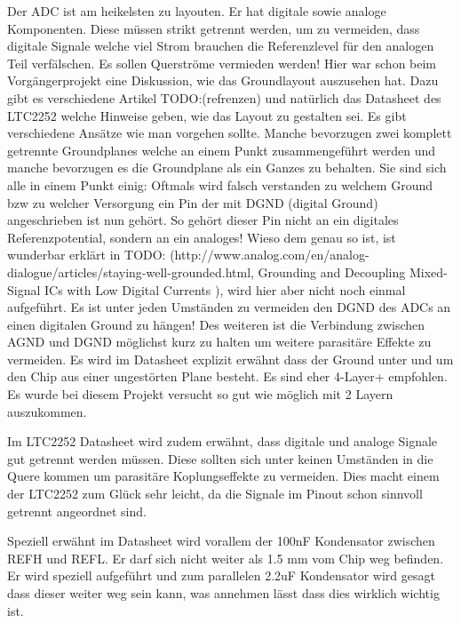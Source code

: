 Der ADC ist am heikelsten zu layouten. Er hat digitale sowie analoge Komponenten. Diese müssen strikt getrennt werden, um zu vermeiden, dass digitale Signale welche viel Strom brauchen die Referenzlevel für den analogen Teil verfälschen. Es sollen Querströme vermieden werden!
Hier war schon beim Vorgängerprojekt eine Diskussion, wie das Groundlayout auszusehen hat. Dazu gibt es verschiedene Artikel TODO:(refrenzen) und natürlich das Datasheet des LTC2252 welche Hinweise geben, wie das Layout zu gestalten sei. Es gibt verschiedene Ansätze wie man vorgehen sollte. Manche bevorzugen zwei komplett getrennte Groundplanes welche an einem Punkt zusammengeführt werden und manche bevorzugen es die Groundplane als ein Ganzes zu behalten. Sie sind sich alle in einem Punkt einig: Oftmals wird falsch verstanden zu welchem Ground bzw zu welcher Versorgung ein Pin der mit DGND (digital Ground) angeschrieben ist nun gehört. So gehört dieser Pin nicht an ein digitales Referenzpotential, sondern an ein analoges! Wieso dem genau so ist, ist wunderbar erklärt in TODO: (http://www.analog.com/en/analog-dialogue/articles/staying-well-grounded.html, Grounding and Decoupling Mixed-Signal ICs with Low Digital Currents ), wird hier aber nicht noch einmal aufgeführt.
Es ist unter jeden Umständen zu vermeiden den DGND des ADCs an einen digitalen Ground zu hängen! Des weiteren ist die Verbindung zwischen AGND und DGND möglichst kurz zu halten um weitere parasitäre Effekte zu vermeiden.
Es wird im Datasheet explizit erwähnt dass der Ground unter und um den Chip aus einer ungestörten Plane besteht. Es sind eher 4-Layer+ empfohlen. Es wurde bei diesem Projekt versucht so gut wie möglich mit 2 Layern auszukommen.

Im LTC2252 Datasheet wird zudem erwähnt, dass digitale und analoge Signale gut getrennt werden müssen. Diese sollten sich unter keinen Umständen in die Quere kommen um parasitäre Koplungseffekte zu vermeiden. Dies macht einem der LTC2252 zum Glück sehr leicht, da die Signale im Pinout schon sinnvoll getrennt angeordnet sind.

Speziell erwähnt im Datasheet wird vorallem der 100nF Kondensator zwischen REFH und REFL. Er darf sich nicht weiter als 1.5 mm vom Chip weg befinden. Er wird speziell aufgeführt und zum parallelen 2.2uF Kondensator wird gesagt dass dieser weiter weg sein kann, was annehmen lässt dass dies wirklich wichtig ist.

